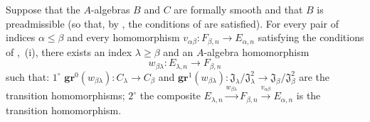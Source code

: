\begin{lemma}[19.5.6.5]
\label{0.19.5.6.5}
Suppose that the $A$-algebras $B$ and $C$ are formally smooth and that $B$ is preadmissible (so that, by , the conditions of  are satisfied).
For every pair of indices $\alpha\leq\beta$ and every homomorphism
$v_{\alpha\beta}:F_{\beta,n}\to E_{\alpha,n}$ satisfying the conditions of
,~{\rm(i)}, there exists an index $\lambda\geq\beta$ and an
$A$-algebra homomorphism
\[
  w_{\beta\lambda}:E_{\lambda,n}\to F_{\beta,n}
\]
such that:
$1^\circ$ $\mathbf{gr}^0(w_{\beta\lambda}):C_\lambda\to C_\beta$ and
$\mathbf{gr}^1(w_{\beta\lambda}):\mathfrak{J}_\lambda/\mathfrak{J}_\lambda^2
\to\mathfrak{J}_\beta/\mathfrak{J}_\beta^2$ are the transition homomorphisms;
$2^\circ$ the composite
$E_{\lambda,n}\xrightarrow{w_{\beta\lambda}}F_{\beta,n}
\xrightarrow{v_{\alpha\beta}}E_{\alpha,n}$ is the transition homomorphism.
\end{lemma}

